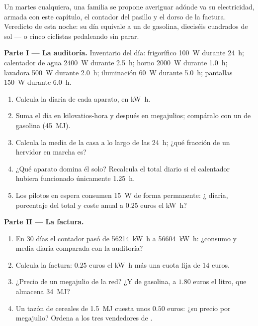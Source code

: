 \begin{problem}
\label{pb:g10:energy-conservation:1}
Un martes cualquiera, una familia se propone averiguar adónde va su
electricidad, armada con este capítulo, el contador del pasillo y el
dorso de la factura. Veredicto de esta noche: su día equivale a un
 de gasolina, dieciséis  cuadrados de sol --- o cinco
ciclistas pedaleando sin parar.

\medskip
\noindent\textbf{Parte I --- La auditoría.}
Inventario del día: frigorífico \qty{100}{W} durante \qty{24}{h};
calentador de agua \qty{2400}{W} durante \qty{2.5}{h}; horno
\qty{2000}{W} durante \qty{1.0}{h}; lavadora \qty{500}{W} durante
\qty{2.0}{h}; iluminación \qty{60}{W} durante \qty{5.0}{h}; pantallas
\qty{150}{W} durante \qty{6.0}{h}.
\begin{enumerate}
  \item Calcula la  diaria de cada aparato, en \unit{kW.h}.
  \item Suma el día en kilovatios-hora y después en megajulios;
        compáralo con un  de gasolina (\qty{45}{MJ}).
  \item Calcula la  media de la casa a lo largo de las
        \qty{24}{h}; ¿qué fracción de un hervidor en marcha es?
  \item ¿Qué aparato domina él solo? Recalcula el total diario si el
        calentador hubiera funcionado únicamente \qty{1.25}{h}.
  \item Los pilotos en espera consumen \qty{15}{W} de forma permanente:
        ¿ diaria, porcentaje del total y coste anual a $0.25$
        euros el \unit{kW.h}?
\end{enumerate}

\medskip
\noindent\textbf{Parte II --- La factura.}
\begin{enumerate}[resume]
  \item En 30 días el contador pasó de \qty{56214}{kW.h} a
        \qty{56604}{kW.h}: ¿consumo y media diaria comparada con la
        auditoría?
  \item Calcula la factura: $0.25$ euros el \unit{kW.h} más una cuota
        fija de $14$ euros.
  \item ¿Precio de un megajulio de la red? ¿Y de gasolina, a $1.80$
        euros el litro, que almacena \qty{34}{MJ}?
  \item Un tazón de cereales de \qty{1.5}{MJ} cuesta unos $0.50$ euros:
        ¿su precio por megajulio? Ordena a los tres vendedores de
        .
\end{enumerate}


\end{problem}
